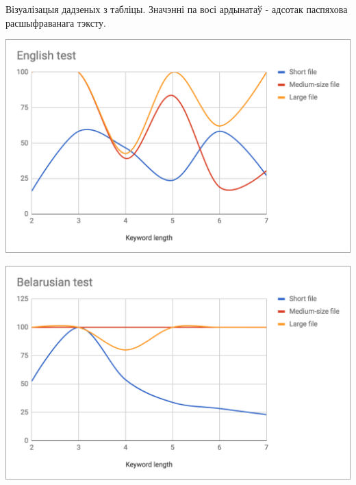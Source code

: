 \documentclass{article}
\begin{document}
Візуалізацыя дадзеных з табліцы. Значэнні па восі ардынатаў - адсотак
паспяхова расшыфраванага тэксту.

\begin{center}
\includegraphics[width=15cm]{en}

\includegraphics[width=15cm]{be}
\end{center}
\end{document}

